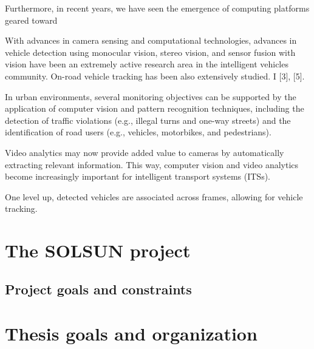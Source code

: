  Furthermore, in recent years, we have
seen the emergence of computing platforms geared toward

With advances in camera sensing and computational technologies,
advances in vehicle detection using monocular vision,
stereo vision, and sensor fusion with vision have been
an extremely active research area in the intelligent vehicles
community. On-road vehicle tracking has been also extensively
studied. I [3], [5].


In urban environments, several monitoring objectives can
be supported by the application of computer vision and pattern
recognition techniques, including the detection of traffic
violations (e.g., illegal turns and one-way streets) and the
identification of road users (e.g., vehicles, motorbikes, and
pedestrians).

Video analytics may now provide added value to cameras by automatically
extracting relevant information. This way, computer
vision and video analytics become increasingly important for
intelligent transport systems (ITSs).

One level up, detected vehicles
are associated across frames, allowing for vehicle tracking.
\section{The SOLSUN project}
\subsection{Project goals and constraints}

\section{Thesis goals and organization}
